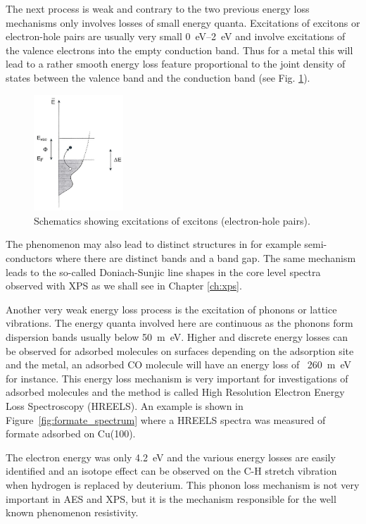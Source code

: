 The next process is weak and contrary to the two previous energy loss mechanisms only involves losses of small energy quanta. Excitations of excitons or electron-hole pairs are usually very small \SIrange{0}{2}{\electronvolt} and involve excitations of the valence electrons into the empty conduction band. Thus for a metal this will lead to a rather smooth energy loss feature proportional to the joint density of states between the valence band and the conduction band (see Fig. \ref{fig:schem_exitons}).

\begin{figure}[htbp]
\centering
\includegraphics[width=0.3\textwidth]{figures/02_12}
\caption{Schematics showing excitations of excitons (electron-hole pairs).}
\label{fig:schem_exitons}
\end{figure}

The phenomenon may also lead to distinct structures in for example semi-conductors where there are distinct bands and a band gap. The same mechanism leads to the so-called Doniach-Sunjic line shapes in the core level spectra observed with XPS as we shall see in Chapter \ref{ch:xps}.

Another very weak energy loss process is the excitation of phonons or lattice vibrations. The energy quanta involved here are continuous as the phonons form dispersion bands usually below \SI{50}{m\electronvolt}. Higher and discrete energy losses can be observed for adsorbed molecules on surfaces depending on the adsorption site and the metal, an adsorbed CO molecule will have an energy loss of ~\SI{260}{m\electronvolt} for instance. This energy loss mechanism is very important for investigations of adsorbed molecules and the method is called High Resolution Electron Energy Loss Spectroscopy (HREELS). An example is shown in Figure~\ref{fig:formate_spectrum} where a HREELS spectra was measured of formate adsorbed on Cu(100).

The electron energy was only \SI{4.2}{\electronvolt} and the various energy losses are easily identified and an isotope effect can be observed on the C-H stretch vibration when hydrogen is replaced by deuterium. This phonon loss mechanism is not very important in AES and XPS, but it is the mechanism responsible for the well known phenomenon resistivity.

